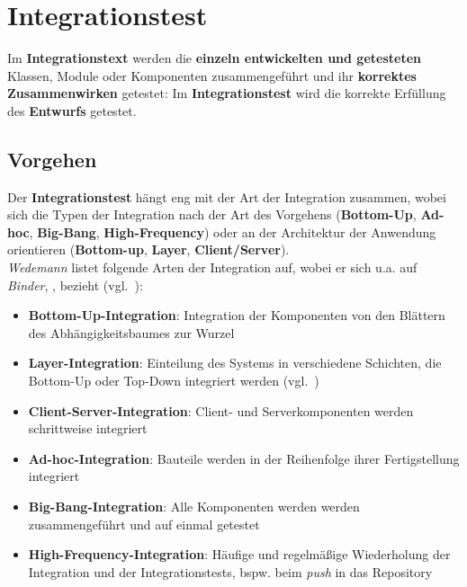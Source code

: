 \section{Integrationstest}
\begin{tcolorbox}[title=Integrationstest]
    Im \textbf{Integrationstext} werden die \textbf{einzeln entwickelten und getesteten} Klassen, Module oder Komponenten zusammengeführt und ihr \textbf{korrektes Zusammenwirken} getestet:
    Im \textbf{Integrationstest} wird die korrekte Erfüllung des \textbf{Entwurfs} getestet.
\end{tcolorbox}

\subsection{Vorgehen}
Der \textbf{Integrationstest} hängt eng mit der Art der Integration zusammen, wobei sich die Typen der Integration nach der Art des Vorgehens (\textbf{Bottom-Up}, \textbf{Ad-hoc}, \textbf{Big-Bang}, \textbf{High-Frequency}) oder an der Architektur der Anwendung orientieren (\textbf{Bottom-up}, \textbf{Layer}, \textbf{Client/Server}).\\

\noindent
\textit{Wedemann} listet folgende Arten der Integration auf, wobei er sich u.a. auf \textit{Binder}, \cite{Bin99}, bezieht (vgl.~\cite[59]{Wed09c}):

\begin{itemize}
    \item \textbf{Bottom-Up-Integration}: Integration der Komponenten von den Blättern des Abhängigkeitsbaumes zur Wurzel
    \item \textbf{Layer-Integration}: Einteilung des Systems in verschiedene Schichten, die Bottom-Up oder Top-Down integriert werden (vgl.~\cite[688]{Bin99})
    \item \textbf{Client-Server-Integration}: Client- und Serverkomponenten werden schrittweise integriert
    \item \textbf{Ad-hoc-Integration}: Bauteile werden in der Reihenfolge ihrer Fertigstellung integriert
    \item \textbf{Big-Bang-Integration}: Alle Komponenten werden werden zusammengeführt und auf einmal getestet
    \item \textbf{High-Frequency-Integration}: Häufige und regelmäßige Wiederholung der Integration und der Integrationstests, bspw. beim \textit{push} in das Repository
\end{itemize}

